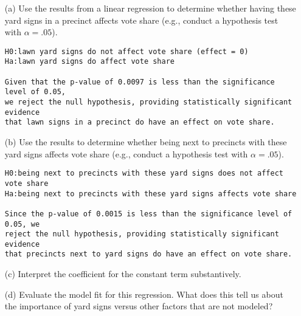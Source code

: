 \documentclass[12pt,letterpaper]{article}
\begin{document}
\begin{enumerate}
	\item [(a)] Use the results from a linear regression to determine whether having these yard signs in a precinct affects vote share (e.g., conduct a hypothesis test with $\alpha = .05$).
	
	\begin{verbatim}
H0:lawn yard signs do not affect vote share (effect = 0)
Ha:lawn yard signs do affect vote share

Given that the p-value of 0.0097 is less than the significance level of 0.05, 
we reject the null hypothesis, providing statistically significant evidence 
that lawn signs in a precinct do have an effect on vote share.
    \end{verbatim}
		
	\item [(b)]  Use the results to determine whether being
	next to precincts with these yard signs affects vote
	share (e.g., conduct a hypothesis test with $\alpha = .05$).
	
	\begin{verbatim}
H0:being next to precincts with these yard signs does not affect vote share
Ha:being next to precincts with these yard signs affects vote share

Since the p-value of 0.0015 is less than the significance level of 0.05, we 
reject the null hypothesis, providing statistically significant evidence 
that precincts next to yard signs do have an effect on vote share.
    \end{verbatim}

	\item [(c)] Interpret the coefficient for the constant term substantively.

	
	\item [(d)] Evaluate the model fit for this regression.  What does this	tell us about the importance of yard signs versus other factors that are not modeled?
	
\end{enumerate}  
\end{document}
